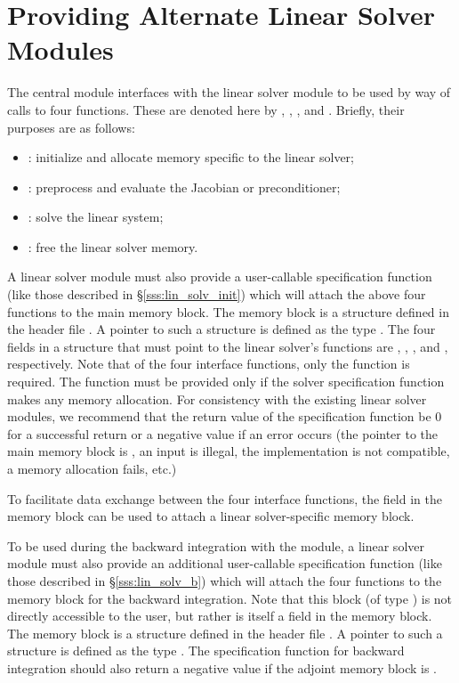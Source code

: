 \chapter{Providing Alternate Linear Solver Modules}\label{s:new_linsolv}
The central {\cvodes} module interfaces with the linear solver module to be
used by way of calls to four functions.  These are denoted here by 
, , , and .
Briefly, their purposes are as follows:
\begin{itemize}
\item {}: initialize and allocate memory specific to the
  linear solver;
\item {}: preprocess and evaluate the Jacobian or preconditioner;
\item {}: solve the linear system;
\item {}: free the linear solver memory.
\end{itemize}
A linear solver module must also provide a user-callable specification
function (like those described in \S\ref{sss:lin_solv_init}) which
will attach the above four functions to the main {\cvodes} memory block.
The {\cvodes} memory block is a structure defined in the header file
.
A pointer to such a structure is defined as the type . 
The four fields in a  structure that must point to the
linear solver's functions are , ,
, and , respectively.
Note that of the four interface functions, only the 
function is required.  The  function must be provided only
if the solver specification function makes any memory allocation.
For consistency with the existing {\cvodes} linear solver modules, we
recommend that the return value of the specification function be 0 for
a successful return or a negative value if an error occurs (the
pointer to the main {\cvodes} memory block is , an input is
illegal, the {\nvector} implementation is not compatible, a memory
allocation fails, etc.)

To facilitate data exchange between the four interface functions, the
field  in the {\cvodes} memory block can be used to
attach a linear solver-specific memory block.


To be used during the backward integration with the {\cvodes} module,
a linear solver module must also provide an additional user-callable
specification function (like those described in
\S\ref{sss:lin_solv_b}) which will attach the four functions to the
{\cvodes} memory block for the backward integration. Note that this
block (of type ) is not directly accessible to
the user, but rather is itself a field in the
{\cvodes} memory block.  The {\cvodes} memory block is a structure
defined in the header file .  A pointer to such a
structure is defined as the type .
The specification function for backward integration should also return
a negative value if the adjoint {\cvodes} memory block is .


